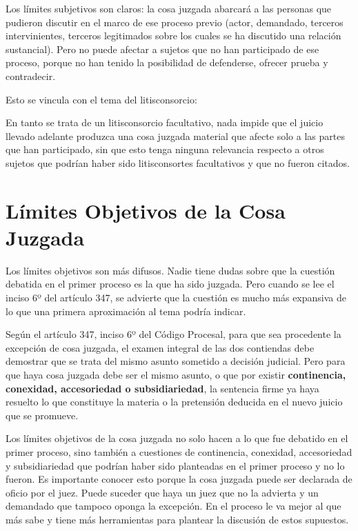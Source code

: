 \documentclass[12pt,oneside]{book}
\begin{document}
Los límites subjetivos son claros: la cosa juzgada abarcará a las personas que pudieron discutir en el marco de ese proceso previo (actor, demandado, terceros intervinientes, terceros legitimados sobre los cuales se ha discutido una relación sustancial). Pero no puede afectar a sujetos que no han participado de ese proceso, porque no han tenido la posibilidad de defenderse, ofrecer prueba y contradecir.

Esto se vincula con el tema del litisconsorcio:

\begin{important}
En tanto se trata de un litisconsorcio facultativo, nada impide que el juicio llevado adelante produzca una cosa juzgada material que afecte solo a las partes que han participado, sin que esto tenga ninguna relevancia respecto a otros sujetos que podrían haber sido litisconsortes facultativos y que no fueron citados.
\end{important}

\section{Límites Objetivos de la Cosa Juzgada}

Los límites objetivos son más difusos. Nadie tiene dudas sobre que la cuestión debatida en el primer proceso es la que ha sido juzgada. Pero cuando se lee el inciso 6º del artículo 347, se advierte que la cuestión es mucho más expansiva de lo que una primera aproximación al tema podría indicar.

Según el artículo 347, inciso 6º del Código Procesal, para que sea procedente la excepción de cosa juzgada, el examen integral de las dos contiendas debe demostrar que se trata del mismo asunto sometido a decisión judicial. Pero para que haya cosa juzgada debe ser el mismo asunto, o que por existir \textbf{continencia, conexidad, accesoriedad o subsidiariedad}, la sentencia firme ya haya resuelto lo que constituye la materia o la pretensión deducida en el nuevo juicio que se promueve.

\begin{important}
Los límites objetivos de la cosa juzgada no solo hacen a lo que fue debatido en el primer proceso, sino también a cuestiones de continencia, conexidad, accesoriedad y subsidiariedad que podrían haber sido planteadas en el primer proceso y no lo fueron. Es importante conocer esto porque la cosa juzgada puede ser declarada de oficio por el juez. Puede suceder que haya un juez que no la advierta y un demandado que tampoco oponga la excepción. En el proceso le va mejor al que más sabe y tiene más herramientas para plantear la discusión de estos supuestos.
\end{important}
\end{document}
